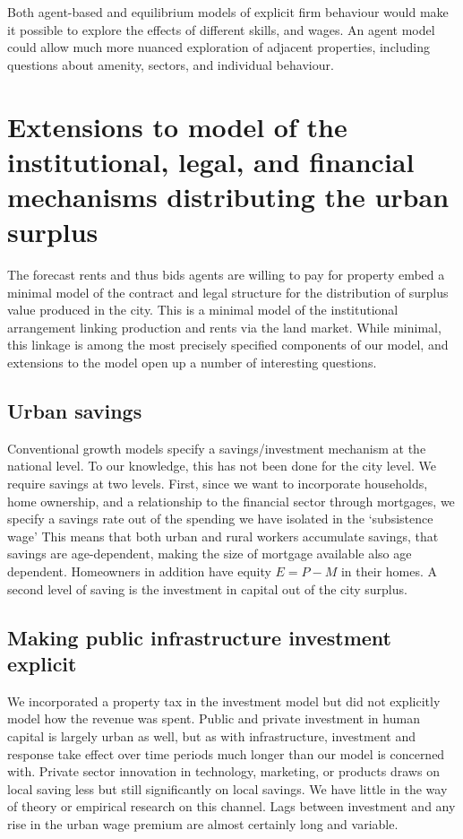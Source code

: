 Both agent-based and equilibrium models of explicit firm behaviour would make it possible to explore the effects of different skills, and wages. An agent model could allow much more nuanced exploration of adjacent properties, including questions about amenity, sectors, and individual behaviour. 



\section{Extensions to model of the institutional, legal, and financial mechanisms distributing the urban surplus}
The forecast rents and thus bids agents are willing to pay for property embed a minimal model of the contract and legal structure for the distribution of surplus value produced in the city. This is a minimal model of the institutional arrangement linking production and rents via the land market. While minimal, this linkage is among the most precisely specified components of our model, and extensions to the model open up a number of interesting questions. 


\subsection{Urban savings}
Conventional growth models specify a savings/investment mechanism at the national level. To our knowledge, this has not been done for the city level. We require savings at two levels. First, since we want to incorporate households, home ownership, and a relationship to the financial sector through mortgages, we specify a savings rate out of the spending we have isolated in the `subsistence wage' This means that both urban and rural workers accumulate savings, that savings are age-dependent, making the size of mortgage available also age dependent. 
Homeowners in addition have equity $E=P-M$ in their homes. %
{A second level of saving is the investment in capital out of the city surplus.} %

\subsection{Making public infrastructure investment explicit}
We incorporated a property tax in the investment model but did not explicitly model how the revenue was spent. Public and private investment in human capital is largely urban as well, but as with infrastructure, investment and response take effect over time periods much longer than our model is concerned with. Private sector innovation in technology, marketing, or products draws on local saving less but still significantly on local savings. We have little in the way of theory or empirical research on this channel. Lags between investment and any rise in the urban wage premium are almost certainly long and variable. 

